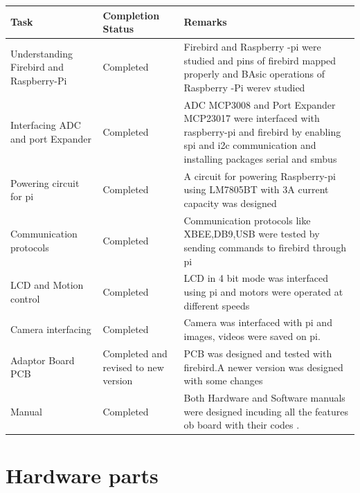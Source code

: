 \documentclass[a4paper,12pt,oneside]{book}
\begin{document}
\begin{table}
\centering
\end{table}
	\begin{tabular}{ |p{4cm}|p{3cm}|p{6cm}|}
	\hline
 \textbf{Task} &  \textbf{Completion Status} &  \textbf{Remarks}\\
 \hline
Understanding Firebird and Raspberry-Pi& Completed & Firebird and Raspberry -pi were studied and pins of firebird mapped properly and BAsic operations of Raspberry -Pi werev studied\\
 \hline
 Interfacing ADC and port Expander&Completed&ADC MCP3008 and Port Expander MCP23017 were interfaced with raspberry-pi and firebird by enabling spi and i2c communication and installing packages serial and smbus \\
 \hline
Powering circuit for pi&Completed&A circuit for powering Raspberry-pi using LM7805BT with 3A current capacity was designed\\
 \hline
 Communication protocols&Completed& Communication protocols like XBEE,DB9,USB were tested by sending commands to firebird through pi\\
 \hline
 LCD and Motion control&Completed & LCD in 4 bit mode was interfaced using pi and motors were operated at different speeds\\
 \hline
Camera interfacing&Completed & Camera was interfaced with pi and images, videos were saved on pi.\\
 \hline
 Adaptor Board PCB& Completed and revised to new version&PCB was designed and tested with firebird.A newer version was designed with some changes \\
 \hline
 Manual &Completed&Both Hardware and Software manuals were designed incuding all the features ob board with their codes .\\
 \hline
\end{tabular}

		
\newpage

\section{Hardware parts}
\end{document}
